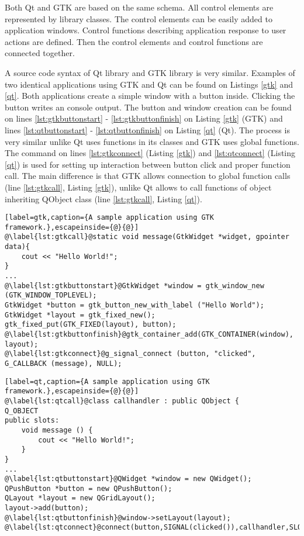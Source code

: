 Both Qt and GTK are based on the same schema. All control elements are represented by library classes. The control elements can be easily added to application windows. Control functions describing application response to user actions are defined. Then the control elements and control functions are connected together.

A source code syntax of Qt library and GTK library is very similar. Examples of two identical applications using GTK and Qt can be found on Listings \ref{gtk} and \ref{qt}. Both applications create a simple window with a button inside. Clicking the button writes an console output. The button and window creation can be found on lines \ref{lst:gtkbuttonstart} - \ref{lst:gtkbuttonfinish} on Listing \ref{gtk} (GTK) and lines \ref{lst:qtbuttonstart} - \ref{lst:qtbuttonfinish} on Listing \ref{qt} (Qt). The process is very similar unlike Qt uses functions in its classes and GTK uses global functions. The command on lines \ref{lst:gtkconnect} (Listing \ref{gtk}) and \ref{lst:qtconnect} (Listing \ref{qt}) is used for setting up interaction between button click and proper function call. The main difference is that GTK allows connection to global function calls (line \ref{lst:gtkcall}, Listing \ref{gtk}), unlike Qt allows to call functions of object inheriting QObject class (line \ref{lst:gtkcall}, Listing \ref{qt}).

\begin{lstlisting}[label=gtk,caption={A sample application using GTK framework.},escapeinside={@}{@}]
@\label{lst:gtkcall}@static void message(GtkWidget *widget, gpointer data){
    cout << "Hello World!";
}
...
@\label{lst:gtkbuttonstart}@GtkWidget *window = gtk_window_new (GTK_WINDOW_TOPLEVEL);
GtkWidget *button = gtk_button_new_with_label ("Hello World");
GtkWidget *layout = gtk_fixed_new();
gtk_fixed_put(GTK_FIXED(layout), button);
@\label{lst:gtkbuttonfinish}@gtk_container_add(GTK_CONTAINER(window), layout);
@\label{lst:gtkconnect}@g_signal_connect (button, "clicked", G_CALLBACK (message), NULL);
\end{lstlisting}

\begin{lstlisting}[label=qt,caption={A sample application using GTK framework.},escapeinside={@}{@}]
@\label{lst:qtcall}@class callhandler : public QObject {
Q_OBJECT
public slots:
	void message () {
		cout << "Hello World!";
	}
}
...
@\label{lst:qtbuttonstart}@QWidget *window = new QWidget();
QPushButton *button = new QPushButton();
QLayout *layout = new QGridLayout();
layout->add(button);
@\label{lst:qtbuttonfinish}@window->setLayout(layout);
@\label{lst:qtconnect}@connect(button,SIGNAL(clicked()),callhandler,SLOT(message()));
\end{lstlisting}



